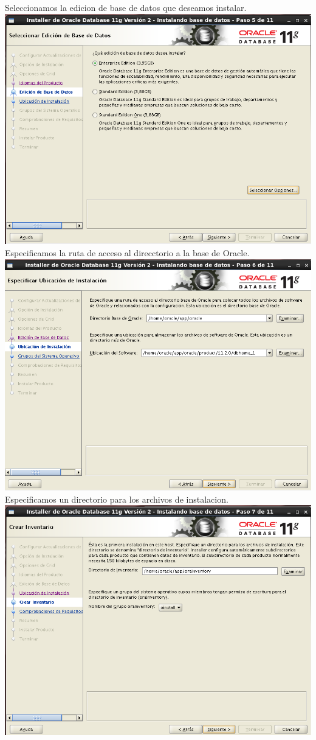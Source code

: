 \documentclass[a4paper,openright,12pt]{book}
\begin{document}
\begin{center}
Seleccionamos la edicion de base de datos que deseamos instalar.\\
\includegraphics[width=15cm]{./oracle linux/16.png}
Especificamos la ruta de acceso al direcctorio a la base de Oracle.\\
\includegraphics[width=15cm]{./oracle linux/17.png}
Especificamos un directorio para los archivos de instalacion.\\
\includegraphics[width=15cm]{./oracle linux/18.png}

\end{center}
\end{document}
